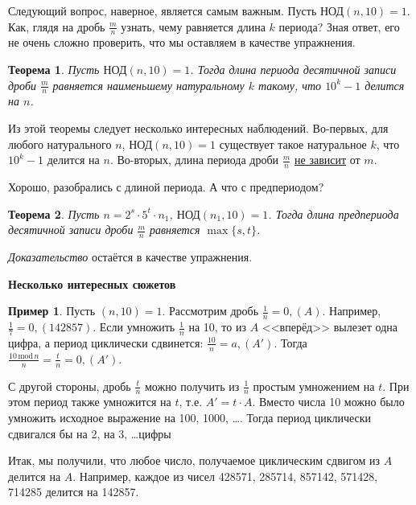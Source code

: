 \documentclass[a4paper,14pt]{extarticle}
\theoremstyle{plain}
\newtheorem{theorem}{Теорема}
\theoremstyle{definition}
\newtheorem{example}{Пример}
\theoremstyle{remark}
\begin{document}
Следующий вопрос, наверное, является самым важным. Пусть $\text{НОД}(n,10)=1$. Как, глядя на дробь
$\frac{m}{n}$ узнать, чему равняется длина $k$ периода? Зная ответ, его не очень сложно проверить,
что мы оставляем в качестве упражнения.

\begin{theorem}
Пусть $\text{НОД}(n,10)=1$. Тогда длина периода десятичной записи дроби $\frac{m}{n}$ равняется наименьшему
натуральному $k$ такому, что $10^k-1$ делится на $n$.
\end{theorem}

Из этой теоремы следует несколько интересных наблюдений.
Во-первых, для любого натурального $n$, $\text{НОД}(n,10)=1$ существует такое натуральное $k$,
что $10^k-1$ делится на $n$. Во-вторых, длина периода дроби $\frac{m}{n}$ \underline{не зависит}
от $m$.

Хорошо, разобрались с длиной периода. А что с предпериодом?

\begin{theorem}
Пусть $n=2^s\cdot 5^t\cdot n_1$, $\text{НОД}(n_1,10)=1$. 
Тогда длина предпериода десятичной записи дроби $\frac{m}{n}$ равняется $\max\{s,t\}$.
\end{theorem}

{\it Доказательство} остаётся в качестве упражнения.

\bigskip
\centerline{\bf Несколько интересных сюжетов}

\begin{example}
Пусть $(n,10)=1$. Рассмотрим дробь $\frac{1}{n}=0{,}(A)$. Например, $\frac{1}{7}=0{,}(142857)$.
Если умножить $\frac{1}{n}$ на 10, то из $A$ <<вперёд>> вылезет одна цифра, а период циклически сдвинется:
$\frac{10}{n}=a{,}(A')$. Тогда $\frac{10\,\mathrm{mod}\,n}{n}=\frac{t}{n}=0{,}(A')$.

С другой стороны, дробь $\frac{t}{n}$ можно получить из $\frac{1}{n}$ простым умножением на $t$.
При этом период также умножится на $t$, т.е. $A'=t\cdot A$. Вместо числа 10 можно было умножить
исходное выражение на 100, 1000, \ldots. Тогда период циклически сдвигался бы на 2, на 3, \ldots цифры

Итак, мы получили, что любое число, получаемое циклическим сдвигом из $A$ делится на $A$.
Например, каждое из чисел 428571, 285714, 857142, 571428, 714285 делится на 142857.
\end{example}
\end{document}
